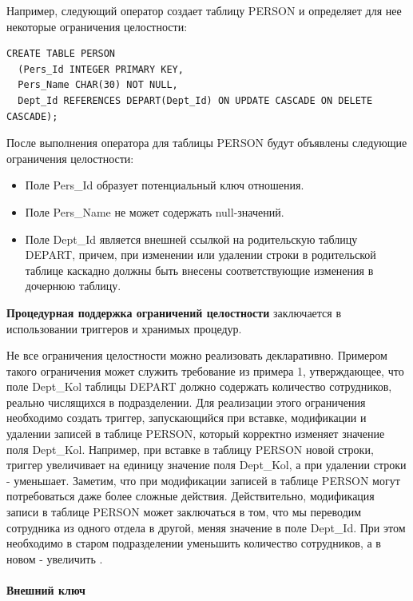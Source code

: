 Например, следующий оператор создает таблицу PERSON и определяет для нее некоторые ограничения целостности:

\begin{verbatim}
CREATE TABLE PERSON
  (Pers_Id INTEGER PRIMARY KEY,
  Pers_Name CHAR(30) NOT NULL,
  Dept_Id REFERENCES DEPART(Dept_Id) ON UPDATE CASCADE ON DELETE CASCADE);
\end{verbatim}

После выполнения оператора для таблицы PERSON будут объявлены следующие ограничения целостности:

\begin{itemize}
    \item Поле Pers\_Id образует потенциальный ключ отношения.
    \item Поле Pers\_Name не может содержать null-значений.
    \item Поле Dept\_Id является внешней ссылкой на родительскую таблицу DEPART, причем, при изменении или удалении строки в родительской таблице каскадно должны быть внесены соответствующие изменения в дочернюю таблицу.
\end{itemize}

\begin{grayquote}
    \textbf{Процедурная поддержка ограничений целостности} заключается в использовании триггеров и хранимых процедур.
\end{grayquote}

Не все ограничения целостности можно реализовать декларативно. Примером такого ограничения может служить требование из примера 1, утверждающее, что поле Dept\_Kol таблицы DEPART должно содержать количество сотрудников, реально числящихся в подразделении. Для реализации этого ограничения необходимо создать триггер, запускающийся при вставке, модификации и удалении записей в таблице PERSON, который корректно изменяет значение поля Dept\_Kol. Например, при вставке в таблицу PERSON новой строки, триггер увеличивает на единицу значение поля Dept\_Kol, а при удалении строки - уменьшает. Заметим, что при модификации записей в таблице PERSON могут потребоваться даже более сложные действия. Действительно, модификация записи в таблице PERSON может заключаться в том, что мы переводим сотрудника из одного отдела в другой, меняя значение в поле Dept\_Id. При этом необходимо в старом подразделении уменьшить количество сотрудников, а в новом - увеличить \autocite{TransCit}.

\paragraph{Внешний ключ} ~\\

